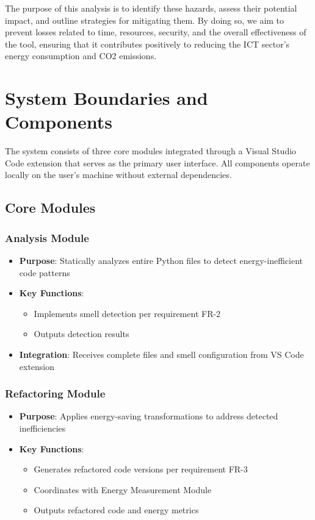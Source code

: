 \documentclass{article}
\newcounter{hazard}
\begin{document}
The purpose of this analysis is to identify these hazards, assess their potential 
impact, and outline strategies for mitigating them. By doing so, we aim to prevent 
losses related to time, resources, security, and the overall effectiveness of the 
tool, ensuring that it contributes positively to reducing the ICT sector's energy 
consumption and CO2 emissions.

\section{System Boundaries and Components}

The system consists of three core modules integrated through a Visual Studio Code extension that serves as the primary user interface. All components operate locally on the user's machine without external dependencies.

\subsection{Core Modules}

\subsubsection{Analysis Module}
\begin{itemize}
    \item \textbf{Purpose}: Statically analyzes entire Python files to detect energy-inefficient code patterns
    \item \textbf{Key Functions}:
    \begin{itemize}
        \item Implements smell detection per requirement FR-2
        \item Outputs detection results
    \end{itemize}
    \item \textbf{Integration}: Receives complete files and smell configuration from VS Code extension
\end{itemize}

\subsubsection{Refactoring Module}
\begin{itemize}
    \item \textbf{Purpose}: Applies energy-saving transformations to address detected inefficiencies
    \item \textbf{Key Functions}:
    \begin{itemize}
        \item Generates refactored code versions per requirement FR-3
        \item Coordinates with Energy Measurement Module
        \item Outputs refactored code and energy metrics
    \end{itemize}
\end{itemize}
\end{document}
